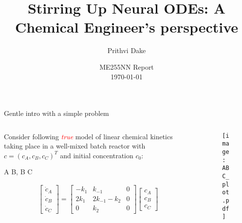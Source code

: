 \documentclass[dvipsnames, 9pt]{beamer}
\title[NODEs]{Stirring Up Neural ODEs: A Chemical Engineer's perspective}
\author[ME255NN--Dake]{Prithvi Dake}
\institute [UCSB]{Department of Chemical
Engineering\\
\pgfuseimage{ucsb-logo}}
\date{ME255NN Report  \\
\today}
\begin{document}
\frame{\titlepage}

\begin{frame}{Gentle intro with a simple problem}
    \begin{columns}
    {\begin{column}{0.45\textwidth}
    \begin{block}{}
        Consider following \textcolor{red}{\textit{true}} model of linear chemical kinetics taking place
        in a well-mixed batch reactor with $c = (c_A, c_B, c_C)^T$ and initial concentration
        $c_0$:
        \begin{rxn*}{} 
        A  B, \qquad  B \rarrow[k_2] C
        \label{rxn:atobtoc}
        \end{rxn*}
        \begin{gather*}
        \begin{bmatrix} \dot{c}_A \\ \dot{c}_B \\ \dot{c}_C \end{bmatrix}
        =\begin{bmatrix}
            -k_{1} & k_{-1} & 0 \\
            2k_{1} & 2k_{-1} - k_2 & 0 \\
            0 & k_{2} & 0
        \end{bmatrix}
        \begin{bmatrix}  c_A \\ c_B \\ c_C \end{bmatrix} 
        \label{eq:atobtoc}
        \end{gather*}
    \end{block}
    \end{column}}
    {\begin{column}{0.5\textwidth}
    \begin{figure}[h]
        \centering
        \texttt{[image: ABC\_plot.pdf]} 
    \end{figure}
    \end{column}}
    \end{columns}
\end{frame}
\end{document}

